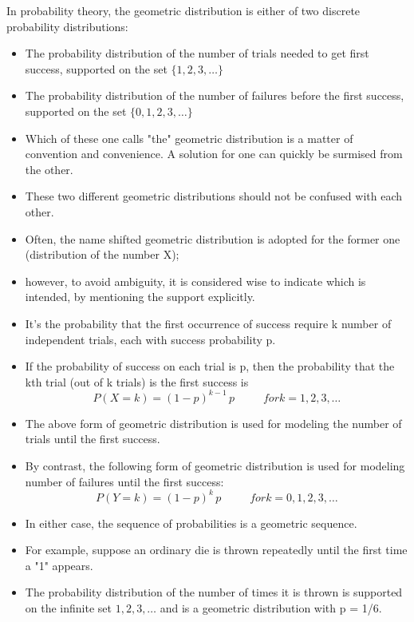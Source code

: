 \documentclass[]{report}
\begin{document}
In probability theory, the geometric distribution is either of two discrete probability distributions:
\begin{itemize}
	\item The probability distribution of the number of trials needed to get first success, supported on the set $\{ 1, 2, 3, \ldots\}$
	\item The probability distribution of the number of failures before the first success, supported on the set $\{ 0, 1, 2, 3, \ldots\}$
	
	\item Which of these one calls "the" geometric distribution is a matter of convention and convenience. A solution for one can quickly be surmised from the other.
	\item These two different geometric distributions should not be confused with each other. 
	\item Often, the name shifted geometric distribution is adopted for the former one (distribution of the number X); 
	\item however, to avoid ambiguity, it is considered wise to indicate which is intended, by mentioning the support explicitly.
	
	\item It’s the probability that the first occurrence of success require k number of independent trials, each with success probability p. 
	
	\item If the probability of success on each trial is p, then the probability that the kth trial (out of k trials) is the first success is
	\[  P(X = k) = (1-p)^{k-1}\,p\, \phantom{space} for k = 1, 2, 3, \ldots \]
	
	
	\item The above form of geometric distribution is used for modeling the number of trials until the first success. 
	
	\item By contrast, the following form of geometric distribution is used for modeling number of failures until the first success:
	\[ P(Y=k) = (1 - p)^k\,p\, \phantom{space} for k = 0, 1, 2, 3, \ldots\]
	
	\item
	In either case, the sequence of probabilities is a geometric sequence.
	
	\item For example, suppose an ordinary die is thrown repeatedly until the first time a "1" appears. 
	\item The probability distribution of the number of times it is thrown is supported on the infinite set ${ 1, 2, 3, \ldots }$ and is a geometric distribution with p = 1/6.
	

\end{itemize}
\end{document}
